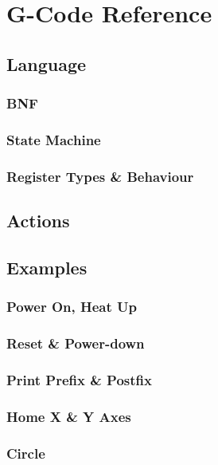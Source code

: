\chapter{G-Code Reference}
	
	\section{Language}
		
		\subsection{BNF}
			
			\label{sec:gcodebnf}
		
		\subsection{State Machine}
			
			\label{sec:stateMachine}
		
		\subsection{Register Types \& Behaviour}
	
	\section{Actions}
		
		\label{sec:gcodeactions}
	
	\section{Examples}
	
		\subsection{Power On, Heat Up}
		
		\subsection{Reset \& Power-down}
		
		\subsection{Print Prefix \& Postfix}
		
		\subsection{Home X \& Y Axes}
			
			\label{sec:gcode_home_xy}
		
		\subsection{Circle}
